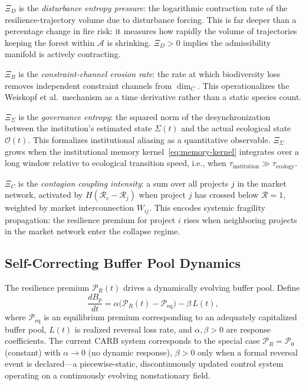 \documentclass[12pt]{article}
\newcommand{\Acal}{\mathcal{A}}
\begin{document}
$\Xi_D$ is the \emph{disturbance entropy pressure}: the logarithmic contraction rate of
the resilience-trajectory volume due to disturbance forcing. This is far deeper than a
percentage change in fire risk: it measures how rapidly the volume of trajectories keeping
the forest within $\Acal$ is shrinking. $\Xi_D>0$ implies the admissibility manifold is
actively contracting.

$\Xi_B$ is the \emph{constraint-channel erosion rate}: the rate at which biodiversity
loss removes independent constraint channels from $\dim_C$. This operationalizes the
Weiskopf et al.\ mechanism as a time derivative rather than a static species count.

$\Xi_\Sigma$ is the \emph{governance entropy}: the squared norm of the desynchronization
between the institution's estimated state $\Sigma(t)$ and the actual ecological state
$\mathcal{O}(t)$. This formalizes institutional aliasing as a quantitative observable.
$\Xi_\Sigma$ grows when the institutional memory kernel~\eqref{eq:memory-kernel} integrates
over a long window relative to ecological transition speed, i.e., when
$\tau_\text{institution}\gg\tau_\text{ecology}$.

$\Xi_C$ is the \emph{contagion coupling intensity}: a sum over all projects $j$ in the
market network, activated by $H(\mathcal{R}_c-\mathcal{R}_j)$ when project $j$ has crossed
below $\mathcal{R}=1$, weighted by market interconnection $W_{ij}$. This encodes systemic
fragility propagation: the resilience premium for project $i$ rises when neighboring
projects in the market network enter the collapse regime.

\subsection{Self-Correcting Buffer Pool Dynamics}

The resilience premium $\mathcal{P}_R(t)$ drives a dynamically evolving buffer pool. Define
\begin{equation}
\label{eq:buffer-dynamics}
\frac{dB_p}{dt}
= \alpha\bigl(\mathcal{P}_R(t) - \mathcal{P}_\text{eq}\bigr)
- \beta\,L(t),
\end{equation}
where $\mathcal{P}_\text{eq}$ is an equilibrium premium corresponding to an adequately
capitalized buffer pool, $L(t)$ is realized reversal loss rate, and $\alpha,\beta>0$ are
response coefficients. The current CARB system corresponds to the special case
$\mathcal{P}_R = \mathcal{P}_0$ (constant) with $\alpha \to 0$ (no dynamic response),
$\beta>0$ only when a formal reversal event is declared---a piecewise-static,
discontinuously updated control system operating on a continuously evolving nonstationary
field.
\end{document}
